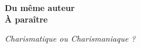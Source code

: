 \newpage
\mbox{}
\vfill
{\scriptsize
\begin{center}
{\bfseries Du même auteur\\À paraître}

\textit{Charismatique ou Charismaniaque ?}

\end{center}
}
\vfill
\mbox{}
\vfill
\mbox{}
\thispagestyle{empty}

